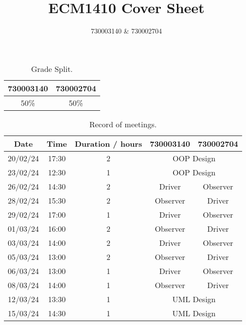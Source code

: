 \documentclass{article}
\title{ECM1410 Cover Sheet}
\author{730003140 \& 730002704}
\begin{document}
\maketitle

\begin{table}[h]
    \centering
    \begin{tabular}{cc}
        \toprule
        \textbf{730003140} & \textbf{730002704} \\
        \midrule
        50\%               & 50\%               \\
        \bottomrule
    \end{tabular}
    \caption{Grade Split.}
\end{table}

\begin{table}[h]
    \centering
    \begin{tabular}{ccccc}
        \toprule
        \textbf{Date} & \textbf{Time} & \textbf{Duration / hours} & \textbf{730003140}             & \textbf{730002704} \\
        \midrule
        20/02/24      & 17:30         & 2                         & \multicolumn{2}{c}{OOP Design}                      \\
        23/02/24      & 12:30         & 1                         & \multicolumn{2}{c}{OOP Design}                      \\
        26/02/24      & 14:30         & 2                         & Driver                         & Observer           \\
        28/02/24      & 15:30         & 2                         & Observer                       & Driver             \\
        29/02/24      & 17:00         & 1                         & Driver                         & Observer           \\
        01/03/24      & 16:00         & 2                         & Observer                       & Driver             \\
        03/03/24      & 14:00         & 2                         & Driver                         & Observer           \\
        05/03/24      & 13:00         & 2                         & Observer                       & Driver             \\
        06/03/24      & 13:00         & 1                         & Driver                         & Observer           \\
        08/03/24      & 14:00         & 1                         & Observer                       & Driver             \\
        12/03/24      & 13:30         & 1                         & \multicolumn{2}{c}{UML Design}                      \\
        15/03/24      & 14:30         & 1                         & \multicolumn{2}{c}{UML Design}                      \\
        \bottomrule
    \end{tabular}
    \caption{Record of meetings.}
\end{table}
\end{document}
